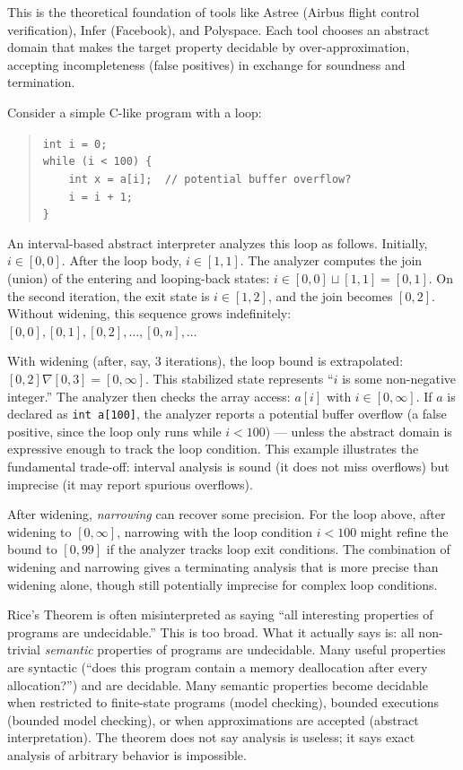 This is the theoretical foundation of tools like Astree (Airbus flight control verification), Infer (Facebook), and Polyspace. Each tool chooses an abstract domain that makes the target property decidable by over-approximation, accepting incompleteness (false positives) in exchange for soundness and termination.

Consider a simple C-like program with a loop:
\begin{quote}
\texttt{int i = 0;}\\
\texttt{while (i < 100) \{}\\
\texttt{\ \ \ \ int x = a[i];\ \ // potential buffer overflow?}\\
\texttt{\ \ \ \ i = i + 1;}\\
\texttt{\}}
\end{quote}

An interval-based abstract interpreter analyzes this loop as follows. Initially, $i \in [0,0]$. After the loop body, $i \in [1,1]$. The analyzer computes the join (union) of the entering and looping-back states: $i \in [0,0] \sqcup [1,1] = [0,1]$. On the second iteration, the exit state is $i \in [1,2]$, and the join becomes $[0,2]$. Without widening, this sequence grows indefinitely: $[0,0], [0,1], [0,2], \ldots, [0,n], \ldots$

With widening (after, say, 3 iterations), the loop bound is extrapolated: $[0,2] \nabla [0,3] = [0, \infty]$. This stabilized state represents ``$i$ is some non-negative integer.'' The analyzer then checks the array access: $a[i]$ with $i \in [0, \infty]$. If $a$ is declared as \texttt{int a[100]}, the analyzer reports a potential buffer overflow (a false positive, since the loop only runs while $i < 100$) --- unless the abstract domain is expressive enough to track the loop condition. This example illustrates the fundamental trade-off: interval analysis is sound (it does not miss overflows) but imprecise (it may report spurious overflows).

After widening, \emph{narrowing} can recover some precision. For the loop above, after widening to $[0, \infty]$, narrowing with the loop condition $i < 100$ might refine the bound to $[0, 99]$ if the analyzer tracks loop exit conditions. The combination of widening and narrowing gives a terminating analysis that is more precise than widening alone, though still potentially imprecise for complex loop conditions.

Rice's Theorem is often misinterpreted as saying ``all interesting properties of programs are undecidable.'' This is too broad. What it actually says is: all non-trivial \emph{semantic} properties of programs are undecidable. Many useful properties are syntactic (``does this program contain a memory deallocation after every allocation?'') and are decidable. Many semantic properties become decidable when restricted to finite-state programs (model checking), bounded executions (bounded model checking), or when approximations are accepted (abstract interpretation). The theorem does not say analysis is useless; it says exact analysis of arbitrary behavior is impossible.

